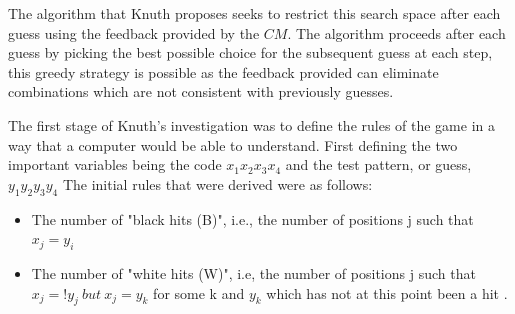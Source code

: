 \documentclass[12pt]{article}  %
\theoremstyle{definition}
\theoremstyle{remark}
\begin{document}
\par The algorithm that Knuth proposes seeks to restrict this search space after each guess using the feedback provided by the $CM$. The algorithm proceeds after each guess by picking the best possible choice for the subsequent guess at each step, this greedy strategy \cite {Wolfram} is possible as the feedback provided can eliminate combinations which are not consistent with previously guesses. 

\par The first stage of Knuth's investigation was to define the rules of the game in a way that a computer would be able to understand. First defining the two important variables being the code $x_1 x_2 x_3 x_4$ and the test pattern, or guess, $y_1 y_2 y_3 y_4$ The initial rules that were derived were as follows:
\begin {itemize}
	\item {The number of "black hits (B)", i.e., the number of positions j such that $x_j = y_i$}
	\item {The number of "white hits (W)", i.e, the number of positions j such that $x_j =! y_j \  but \ x_j = y_k$ for some k and $y_k$ which has not at this point been a hit \cite {Knuth}.}
\end {itemize}
\end{document}
